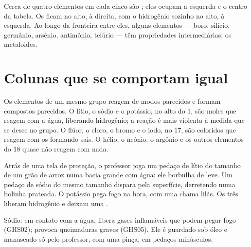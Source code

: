 \begin{proposition}\label{prop:g9:periodic-table-first-look:where}
Cerca de quatro elementos em cada cinco são ; eles ocupam a
esquerda e o centro da tabela. Os  ficam no alto, à direita,
com o hidrogênio sozinho no alto, à esquerda. Ao longo da fronteira
entre eles, alguns elementos --- boro, silício, germânio, arsênio,
antimônio, telúrio --- têm propriedades intermediárias: os metaloides.
\end{proposition}

\section{Colunas que se comportam igual}

\begin{proposition}\label{prop:g9:periodic-table-first-look:alike}
Os elementos de um mesmo grupo reagem de modos parecidos e formam
compostos parecidos. O lítio, o sódio e o potássio, no alto do  1,
são  moles que reagem com a água, liberando hidrogênio; a reação é
mais violenta à medida que se desce no grupo. O flúor, o cloro, o bromo
e o iodo, no  17, são  coloridos que reagem com os 
formando sais. O hélio, o neônio, o argônio e os outros elementos do
 18 quase não reagem com nada.
\end{proposition}

\begin{inthelab}
Atrás de uma tela de proteção, o professor joga um pedaço de lítio do
tamanho de um grão de arroz numa bacia grande com água: ele borbulha de
leve. Um pedaço de sódio do mesmo tamanho dispara pela superfície,
derretendo numa bolinha prateada. O potássio pega fogo na hora, com uma
chama lilás. Os três liberam hidrogênio e deixam uma .
\end{inthelab}

\begin{safety}{}
Sódio: em contato com a água, libera gases inflamáveis que podem
pegar fogo (GHS02); provoca queimaduras graves (GHS05). Ele é guardado
sob óleo e manuseado só pelo professor, com uma pinça, em pedaços
minúsculos.
\end{safety}

